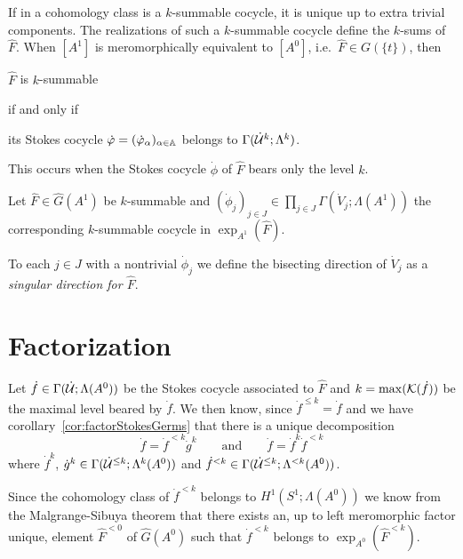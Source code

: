 If in a cohomology class is a $k$-summable cocycle, it is unique up to extra
trivial components.
The realizations of such a $k$-summable cocycle define the $k$-sums of
$\hat F$.
When $[A^1]$ is meromorphically equivalent to $[A^0]$,
i.e.\ $\hat F\in G(\!\{t\}\!)$, then
\begin{einr}
  $\hat F$ is $k$-summable
\end{einr}
if and only if
\begin{einr}
  its Stokes cocycle $\dot{\varphi}=(\dot{\varphi}_\alpha)_{\alpha\in\mathbb{A}}$ belongs to
  $\Gamma(\dot{\mathcal{U}}^k;\Lambda^k)$.
\end{einr}
This occurs when the Stokes cocycle $\dot\phi$ of $\hat F$ bears only the level
$k$.

\begin{comment}
  \cite[883]{Loday1994} Turrittin's problem
\end{comment}

\begin{defn}\label{defn:singlDir}
  Let $\hat F\in\hat G(A^1)$ be $k$-summable and $(\dot\phi_j)_{j\in
  J}\in\prod_{j\in J}\Gamma(\dot V_j;\Lambda(A^1))$ the corresponding
  $k$-summable cocycle in $\exp_{A^1}(\hat F)$.

  To each $j\in J$ with a nontrivial $\dot\phi_j$ we define the bisecting
  direction of $\dot V_j$ as a \emph{singular direction for $\hat F$}.
\end{defn}

\section{Factorization}

Let $\dot f\in\Gamma(\dot{\mathcal{U}};\Lambda(A^0))$ be the Stokes cocycle associated to
$\hat F$ and $k=\max(\mathcal{K}(\dot f))$ be the maximal level beared by $\dot f$.
We then know, since $\dot f^{\leq k}=\dot f$ and we have
corollary~\ref{cor:factorStokesGerms} that there is a unique decomposition
\[
  \dot f=\dot f^{<k}\dot g^k
  \qquad\text{and}\qquad
  \dot f=\dot f^k\dot f^{<k}
\]
where $\dot f^k$, $\dot g^k\in\Gamma(\dot{\mathcal{U}}^{\leq k};\Lambda^k(A^0))$ and
$\dot f^{<k}\in\Gamma(\dot{\mathcal{U}}^{\leq k};\Lambda^{<k}(A^0))$.

Since the cohomology class of $\dot f^{<k}$ belongs to $H^1(S^1;\Lambda(A^0))$
we know from the Malgrange-Sibuya theorem that there exists an, up to left
meromorphic factor unique, element $\hat F^{<0}$ of $\hat G(A^0)$ such that
$\dot f^{<k}$ belongs to $\exp_{A^0}(\hat F^{<k})$.


